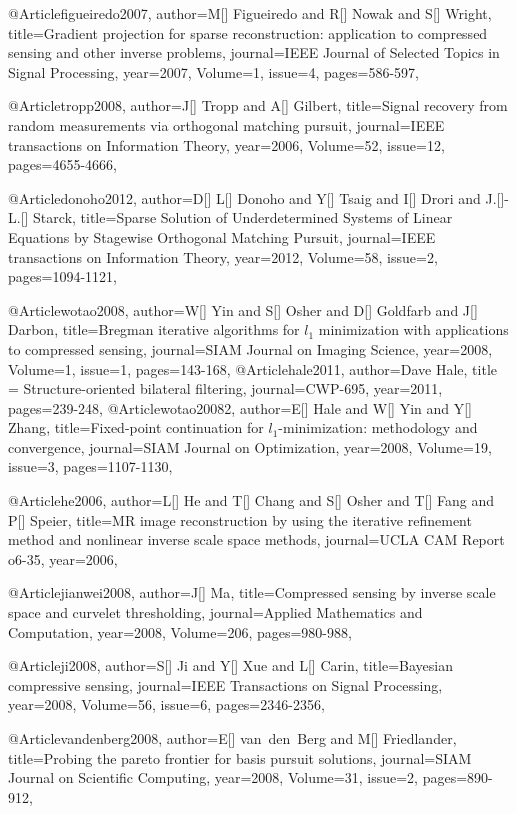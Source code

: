 {@Article{figueiredo2007,
  author={M[] Figueiredo and R[] Nowak and S[] Wright},
  title={Gradient projection for sparse reconstruction: application to compressed sensing and other inverse problems},
  journal={IEEE Journal of Selected Topics in Signal Processing},
  year=2007,
  Volume=1,
  issue=4,
  pages={586-597},
}


@Article{tropp2008,
  author={J[] Tropp and A[] Gilbert},
  title={Signal recovery from random measurements via orthogonal matching pursuit},
  journal={IEEE transactions on Information Theory},
  year=2006,
  Volume=52,
  issue=12,
  pages={4655-4666},
}


@Article{donoho2012,
  author={D[] L[] Donoho and Y[] Tsaig and I[] Drori and J.[]-L.[] Starck},
  title={Sparse Solution of Underdetermined Systems of Linear Equations by Stagewise Orthogonal Matching Pursuit},
  journal={IEEE transactions on Information Theory},
  year=2012,
  Volume=58,
  issue=2,
  pages={1094-1121},
}

@Article{wotao2008,
  author={W[] Yin and S[] Osher and D[] Goldfarb and J[] Darbon},
  title={Bregman iterative algorithms for $l_1$ minimization with applications to compressed sensing},
  journal={SIAM Journal on Imaging Science},
  year=2008,
  Volume=1,
  issue=1,
  pages={143-168},
}
@Article{hale2011,
  author={Dave Hale},
  title = {Structure-oriented bilateral filtering},
  journal={CWP-695},
  year=2011,
  pages={239-248},
}
@Article{wotao20082,
  author={E[] Hale and W[] Yin and Y[] Zhang},
  title={Fixed-point continuation for $l_1$-minimization: methodology and convergence},
  journal={SIAM Journal on Optimization},
  year=2008,
  Volume=19,
  issue=3,
  pages={1107-1130},
}

@Article{he2006,
  author={L[] He and T[] Chang and S[] Osher and T[] Fang and P[] Speier},
  title={MR image reconstruction by using the iterative refinement method and nonlinear inverse scale space methods},
  journal={UCLA CAM Report o6-35},
  year=2006,
}

@Article{jianwei2008,
  author={J[] Ma},
  title={Compressed sensing by inverse scale space and curvelet thresholding},
  journal={Applied Mathematics and Computation},
  year=2008,
  Volume=206,
  pages={980-988},
}

@Article{ji2008,
  author={S[] Ji and Y[] Xue and L[] Carin},
  title={Bayesian compressive sensing},
  journal={IEEE Transactions on Signal Processing},
  year=2008,
  Volume=56,
  issue=6,
  pages={2346-2356},
}

@Article{vandenberg2008,
  author={E[] van~den~Berg and M[] Friedlander},
  title={Probing the pareto frontier for basis pursuit solutions},
  journal={SIAM Journal on Scientific Computing},
  year=2008,
  Volume=31,
  issue=2,
  pages={890-912},
}

}
